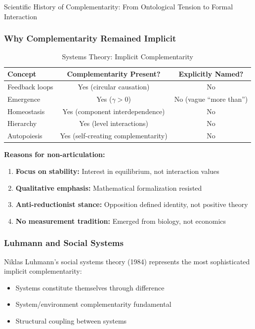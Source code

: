 \begin{chapter}{Scientific History of Complementarity: From Ontological Tension to Formal Interaction}
\subsubsection{Why Complementarity Remained Implicit}

\begin{table}[h]
\centering
\caption{Systems Theory: Implicit Complementarity}
\label{tab:systems-implicit}
\renewcommand{\arraystretch}{1.3}
\begin{tabular}{@{}lcc@{}}
\toprule
\textbf{Concept} & \textbf{Complementarity Present?} & \textbf{Explicitly Named?} \\
\midrule
Feedback loops & Yes (circular causation) & No \\
Emergence & Yes ($\gamma > 0$) & No (vague ``more than'') \\
Homeostasis & Yes (component interdependence) & No \\
Hierarchy & Yes (level interactions) & No \\
Autopoiesis & Yes (self-creating complementarity) & No \\
\bottomrule
\end{tabular}
\end{table}

\textbf{Reasons for non-articulation:}
\begin{enumerate}
    \item \textbf{Focus on stability:} Interest in equilibrium, not interaction values
    \item \textbf{Qualitative emphasis:} Mathematical formalization resisted
    \item \textbf{Anti-reductionist stance:} Opposition defined identity, not positive theory
    \item \textbf{No measurement tradition:} Emerged from biology, not economics
\end{enumerate}

\subsubsection{Luhmann and Social Systems}

Niklas Luhmann's social systems theory (1984) represents the most sophisticated implicit complementarity:

\begin{itemize}[noitemsep]
    \item Systems constitute themselves through difference
    \item System/environment complementarity fundamental
    \item Structural coupling between systems
\end{itemize}


\end{chapter}
